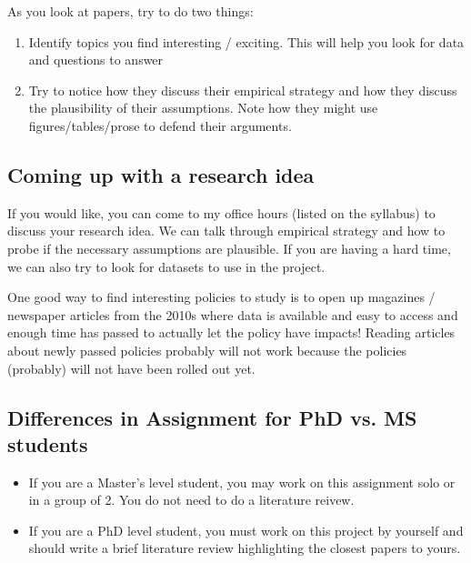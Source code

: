 \documentclass[12pt]{article}
\begin{document}
As you look at papers, try to do two things:
\begin{enumerate}
  \item Identify topics you find interesting / exciting. This will help you look for data and questions to answer
  
  \item Try to notice how they discuss their empirical strategy and how they discuss the plausibility of their assumptions. 
  Note how they might use figures/tables/prose to defend their arguments.
\end{enumerate}

\bigskip
\subsection*{Coming up with a research idea}

If you would like, you can come to my office hours (listed on the syllabus) to discuss your research idea. 
We can talk through empirical strategy and how to probe if the necessary assumptions are plausible. 
If you are having a hard time, we can also try to look for datasets to use in the project.

One good way to find interesting policies to study is to open up magazines / newspaper articles from the 2010s where data is available and easy to access and enough time has passed to actually let the policy have impacts!
Reading articles about newly passed policies probably will not work because the policies (probably) will not have been rolled out yet.


\bigskip
\subsection*{Differences in Assignment for PhD vs. MS students}

\begin{itemize}
  \item If you are a Master's level student, you may work on this assignment solo or in a group of 2. You do not need to do a literature reivew.
  \item If you are a PhD level student, you must work on this project by yourself and should write a brief literature review highlighting the closest papers to yours.
\end{itemize}
\end{document}
